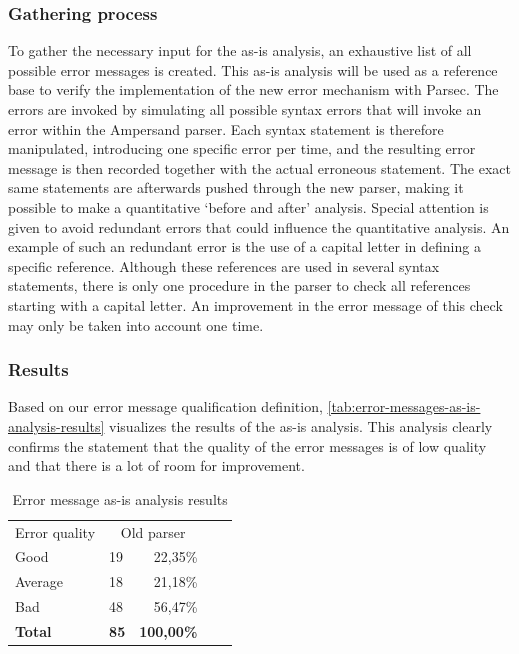 \subsubsection{Gathering process}

To gather the necessary input for the as-is analysis, an exhaustive list of all possible error messages is created.
This as-is analysis will be used as a reference base to verify the implementation of the new error mechanism with Parsec.
The errors are invoked by simulating all possible syntax errors that will invoke an error within the Ampersand parser.
Each syntax statement is therefore manipulated, introducing one specific error per time, and the resulting error message is then recorded together with the actual erroneous statement.
The exact same statements are afterwards pushed through the new parser, making it possible to make a quantitative `before and after' analysis.
Special attention is given to avoid redundant errors that could influence the quantitative analysis. 
An example of such an redundant error is the use of a capital letter in defining a specific reference. 
Although these references are used in several syntax statements, there is only one procedure in the parser to check all references starting with a capital letter.
An improvement in the error message of this check may only be taken into account one time.

\subsubsection{Results}
Based on our error message qualification definition, \autoref{tab:error-messages-as-is-analysis-results} visualizes the results of the as-is analysis.
This analysis clearly confirms the statement that the quality of the error messages is of low quality and that there is a lot of room for improvement.

\begin{table}[h]
  \centering
	\begin{tabular}{llrlr}
    Error quality  & \multicolumn{2}{c}{Old parser}     \\
		Good           & 19          & 22,35\%         \\
		Average        & 18          & 21,18\%       \\
		Bad            & 48          & 56,47\%           \\
		\rowcolor[HTML]{BBBBBB}
		\textbf{Total} & \textbf{85} & \textbf{100,00\%} 
	\end{tabular}
  \caption{Error message as-is analysis results}
  \label{tab:error-messages-as-is-analysis-results}
\end{table}
